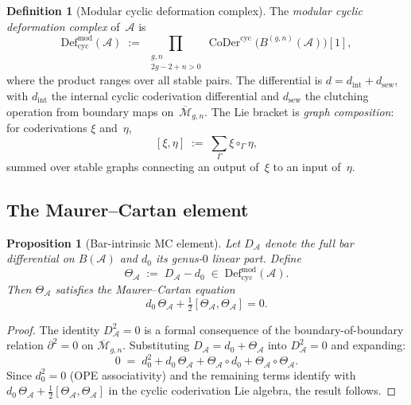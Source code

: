 \documentclass[11pt,reqno]{amsart}
\newtheorem{proposition}[theorem]{Proposition}
\theoremstyle{definition}
\newtheorem{definition}[theorem]{Definition}
\theoremstyle{remark}
\newcommand{\cA}{\mathcal{A}}
\newcommand{\Defcyc}{\mathrm{Def}_{\mathrm{cyc}}}
\newcommand{\Mbar}{\overline{\mathcal{M}}}
\numberwithin{equation}{section}
\begin{document}
\begin{definition}[Modular cyclic deformation
complex]\label{def:mod-cyc}
The \emph{modular cyclic deformation complex} of~$\cA$ is
\begin{equation}\label{eq:mod-cyc}
 \Defcyc^{\mathrm{mod}}(\cA)
 \;:=\;
 \prod_{\substack{g,n \\ 2g-2+n>0}}
 \operatorname{CoDer}^{\mathrm{cyc}}\!\bigl(
 B^{(g,n)}(\cA)\bigr)[1],
\end{equation}
where the product ranges over all stable pairs.
The differential is $d = d_{\mathrm{int}} +
d_{\mathrm{sew}}$, with $d_{\mathrm{int}}$ the internal
cyclic coderivation differential and $d_{\mathrm{sew}}$ the
clutching operation from boundary maps on~$\Mbar_{g,n}$.
The Lie bracket is \emph{graph composition}: for
coderivations $\xi$ and~$\eta$,
\begin{equation}\label{eq:graph-bracket}
 [\xi,\eta]
 \;:=\;
 \sum_\Gamma \xi \circ_\Gamma \eta,
\end{equation}
summed over stable graphs connecting an output of~$\xi$
to an input of~$\eta$.
\end{definition}

\subsection{The Maurer--Cartan
element}\label{subsec:mc-element}

\begin{proposition}[Bar-intrinsic MC
element]\label{prop:bar-mc}
Let $D_\cA$ denote the full bar differential on $B(\cA)$
and $d_0$ its genus-$0$ linear part. Define
\begin{equation}\label{eq:theta-def}
 \Theta_\cA \;:=\; D_\cA - d_0
 \;\in\; \Defcyc^{\mathrm{mod}}(\cA).
\end{equation}
Then $\Theta_\cA$ satisfies the Maurer--Cartan equation
\begin{equation}\label{eq:mc-equation}
 d_0\,\Theta_\cA + \tfrac{1}{2}[\Theta_\cA, \Theta_\cA]
 = 0.
\end{equation}
\end{proposition}

\begin{proof}
The identity $D_\cA^2 = 0$ is a formal consequence of the
boundary-of-boundary relation $\partial^2 = 0$ on
$\Mbar_{g,n}$. Substituting $D_\cA = d_0 + \Theta_\cA$
into $D_\cA^2 = 0$ and expanding:
\[
 0 \;=\; d_0^2 + d_0\,\Theta_\cA + \Theta_\cA \circ d_0
 + \Theta_\cA \circ \Theta_\cA.
\]
Since $d_0^2 = 0$ (OPE associativity) and
the remaining terms identify with
$d_0\,\Theta_\cA + \frac{1}{2}[\Theta_\cA, \Theta_\cA]$
in the cyclic coderivation Lie algebra, the result follows.
\end{proof}
\end{document}
